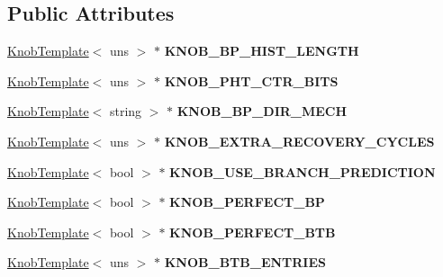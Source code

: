 \subsection*{Public Attributes}
\begin{DoxyCompactItemize}
\item 
\hypertarget{classall__knobs__c_a1f6363ae6857d8f629f9b80868180d87}{
\hyperlink{classKnobTemplate}{KnobTemplate}$<$ uns $>$ $\ast$ {\bfseries KNOB\_\-BP\_\-HIST\_\-LENGTH}}
\label{classall__knobs__c_a1f6363ae6857d8f629f9b80868180d87}

\item 
\hypertarget{classall__knobs__c_a53a1e912a8f695de593f6e7630f13a81}{
\hyperlink{classKnobTemplate}{KnobTemplate}$<$ uns $>$ $\ast$ {\bfseries KNOB\_\-PHT\_\-CTR\_\-BITS}}
\label{classall__knobs__c_a53a1e912a8f695de593f6e7630f13a81}

\item 
\hypertarget{classall__knobs__c_aa7be9696c727c4b2378db21af57b8a99}{
\hyperlink{classKnobTemplate}{KnobTemplate}$<$ string $>$ $\ast$ {\bfseries KNOB\_\-BP\_\-DIR\_\-MECH}}
\label{classall__knobs__c_aa7be9696c727c4b2378db21af57b8a99}

\item 
\hypertarget{classall__knobs__c_ac28c2e0bd4c7e74f11ee4362706a257b}{
\hyperlink{classKnobTemplate}{KnobTemplate}$<$ uns $>$ $\ast$ {\bfseries KNOB\_\-EXTRA\_\-RECOVERY\_\-CYCLES}}
\label{classall__knobs__c_ac28c2e0bd4c7e74f11ee4362706a257b}

\item 
\hypertarget{classall__knobs__c_a447ff7a6346b64d976a8441a4d1f6576}{
\hyperlink{classKnobTemplate}{KnobTemplate}$<$ bool $>$ $\ast$ {\bfseries KNOB\_\-USE\_\-BRANCH\_\-PREDICTION}}
\label{classall__knobs__c_a447ff7a6346b64d976a8441a4d1f6576}

\item 
\hypertarget{classall__knobs__c_aac13686cfde24efc6deeb52a15c7e717}{
\hyperlink{classKnobTemplate}{KnobTemplate}$<$ bool $>$ $\ast$ {\bfseries KNOB\_\-PERFECT\_\-BP}}
\label{classall__knobs__c_aac13686cfde24efc6deeb52a15c7e717}

\item 
\hypertarget{classall__knobs__c_aeb38948c6336978437d7eaf4d61eaba6}{
\hyperlink{classKnobTemplate}{KnobTemplate}$<$ bool $>$ $\ast$ {\bfseries KNOB\_\-PERFECT\_\-BTB}}
\label{classall__knobs__c_aeb38948c6336978437d7eaf4d61eaba6}

\item 
\hypertarget{classall__knobs__c_abddba6c25c84d952f2e2e2175ccad9aa}{
\hyperlink{classKnobTemplate}{KnobTemplate}$<$ uns $>$ $\ast$ {\bfseries KNOB\_\-BTB\_\-ENTRIES}}
\label{classall__knobs__c_abddba6c25c84d952f2e2e2175ccad9aa}


\end{DoxyCompactItemize}
